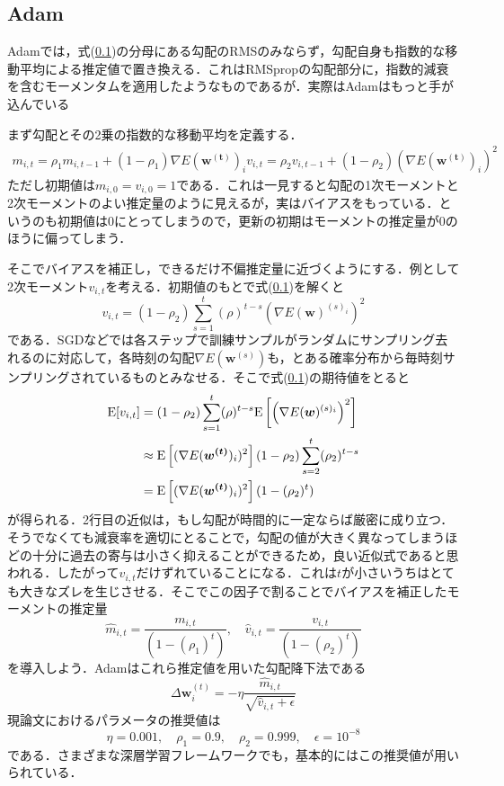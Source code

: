 \documentclass[a4paper,11pt]{jsreport}
\begin{document}
\subsection{Adam}
Adamでは，式(\ref{})の分母にある勾配のRMSのみならず，勾配自身も指数的な移動平均による推定値で置き換える．これはRMSpropの勾配部分に，指数的減衰を含むモーメンタムを適用したようなものであるが．実際はAdamはもっと手が込んでいる\par
まず勾配とその2乗の指数的な移動平均を定義する．
\begin{align}
  m_{i,t} = \rho_1 m_{i,t-1} + (1 - \rho_1) \nabla E(\bm{w^{(t)}})_i 
  v_{i,t} = \rho_2 v_{i,t-1} + (1 - \rho_2) \left(\nabla E(\bm{w^{(t)}})_i\right)^2
\end{align}
ただし初期値は$m_{i,0}=v_{i,0}=1$である．これは一見すると勾配の1次モーメントと2次モーメントのよい推定量のように見えるが，実はバイアスをもっている．というのも初期値は0にとってしまうので，更新の初期はモーメントの推定量が0のほうに偏ってしまう．\par
そこでバイアスを補正し，できるだけ不偏推定量に近づくようにする．例として2次モーメント$v_{i,t}$を考える．初期値のもとで式(\ref{})を解くと
\begin{equation}
  v_{i,t} = (1 - \rho_2)\sum_{s=1}^t (\rho)^{t-s} \left(\nabla E(\bm{w})^{(s)_i}\right)^2
\end{equation}
である．SGDなどでは各ステップで訓練サンプルがランダムにサンプリング去れるのに対応して，各時刻の勾配$\nabla E(\bm{w}^{(s)})$も，とある確率分布から毎時刻サンプリングされているものとみなせる．そこで式(\ref{})の期待値をとると
\begin{align}
  \mathrm{E}[v_{i,t}]
  &= (1-\rho_2)\sum_{s=1}^t (\rho)^{t-s} \mathrm{E}\left[\left(\nabla E(\bm{w})^{(s)_i}\right)^2\right] \notag \\
  &\approx \mathrm{E}\left[(\nabla E(\bm{w^{(t)}})_i)^2 \right] (1 - \rho_2) \sum_{s=2}^t (\rho_2)^{t-s} \notag \\
  &= \mathrm{E}\left[(\nabla E(\bm{w^{(t)}})_i)^2 \right] (1 - (\rho_2)^t)
\end{align}
が得られる．2行目の近似は，もし勾配が時間的に一定ならば厳密に成り立つ．そうでなくても減衰率を適切にとることで，勾配の値が大きく異なってしまうほどの十分に過去の寄与は小さく抑えることができるため，良い近似式であると思われる．したがって$v_{i,t}$だけずれていることになる．これは$t$が小さいうちはとても大きなズレを生じさせる．そこでこの因子で割ることでバイアスを補正したモーメントの推定量
\begin{equation}
  \hat{m}_{i,t} = \frac{m_{i,t}}{(1 - (\rho_1)^t)}, \quad \hat{v}_{i,t} = \frac{v_{i,t}}{(1 - (\rho_2)^t)}
\end{equation}
を導入しよう．Adamはこれら推定値を用いた勾配降下法である
\begin{equation}
  \Delta \bm{w}_i^{(t)}
  = -\eta \frac{\hat{m}_{i,t}}{\sqrt{\hat{v}_{i,t} + \epsilon}}
\end{equation}
現論文におけるパラメータの推奨値は
\begin{equation}
  \eta = 0.001, \quad \rho_1 = 0.9, \quad \rho_2 = 0.999, \quad \epsilon = 10^{-8}
\end{equation}
である．さまざまな深層学習フレームワークでも，基本的にはこの推奨値が用いられている．
\end{document}
